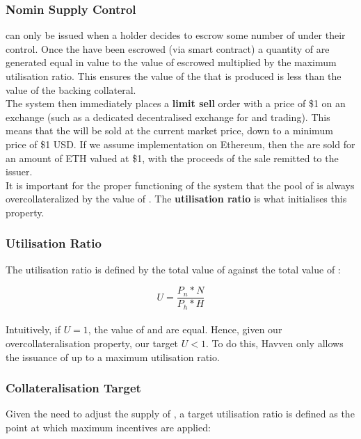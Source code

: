 \subsubsection{Nomin Supply Control}

\noindent \NOM{} can only be issued when a \HAV{} holder decides to escrow some number of \HAV{} under their control. Once the \HAV{} have been escrowed (via smart contract) a quantity of \NOM{} are generated equal in value to the value of escrowed \HAV{} multiplied by the maximum utilisation ratio. This ensures the value of the \NOM{} that is produced is less than the value of the backing \HAV{} collateral. \\

\noindent The system then immediately places a \textbf{limit sell} order with a price of \$1 on an exchange (such as a dedicated decentralised exchange for \HAV{} and \NOM{} trading). This means that the \NOM{} will be sold at the current market price, down to a minimum price of \$1 USD. If we assume implementation on Ethereum, then the \NOM{} are sold for an amount of ETH valued at \$1, with the proceeds of the sale remitted to the issuer. \\

\noindent It is important for the proper functioning of the system that the pool of \NOM{} is always overcollateralized by the value of \HAV{}. The \textbf{utilisation ratio} is what initialises this property.

\subsubsection{Utilisation Ratio}

\noindent The utilisation ratio is defined by the total value of \NOM{} against the total value of \HAV{}:

$$ U = \frac{P_n * N}{P_h * H} $$ \\

\noindent Intuitively, if $U = 1$, the value of \NOM{} and \HAV{} are equal. Hence, given our overcollateralisation property, our target $U <  1$. To do this, Havven only allows the issuance of \NOM{} up to a maximum utilisation ratio.

\subsubsection{Collateralisation Target}

\noindent Given the need to adjust the supply of \NOM{}, a target utilisation ratio is defined as the point at which maximum incentives are applied:

